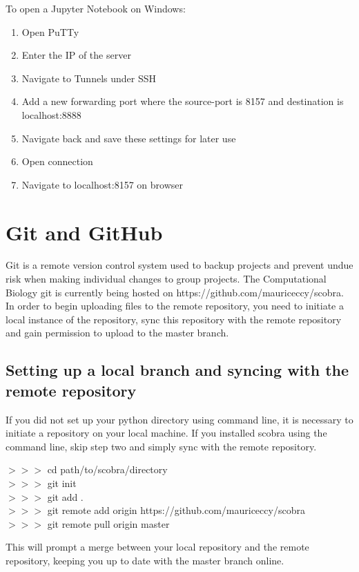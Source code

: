 To open a Jupyter Notebook on Windows:
\begin{enumerate}
\item Open PuTTy
\item Enter the IP of the server
\item Navigate to Tunnels under SSH
\item Add a new forwarding port where the source-port is 8157 and destination is localhost:8888
\item Navigate back and save these settings for later use
\item Open connection
\item Navigate to localhost:8157 on browser
\end{enumerate}

\section{Git and GitHub}
Git is a remote version control system used to backup projects and prevent undue risk when making individual changes to group projects. The Computational Biology git is currently being hosted on https://github.com/mauriceccy/scobra. In order to begin uploading files to the remote repository, you need to initiate a local instance of the repository, sync this repository with the remote repository and gain permission to upload to the master branch.

\subsection{Setting up a local branch and syncing with the remote repository}

If you did not set up your python directory using command line, it is necessary to initiate a repository on your local machine. If you installed scobra using the command line, skip step two and simply sync with the remote repository.

\begin{mdframed}
$>>>$ \quad cd path/to/scobra/directory\\
$>>>$ \quad git init\\
$>>>$ \quad git add .\\
$>>>$ \quad git remote add origin https://github.com/mauriceccy/scobra\\
$>>>$ \quad git remote pull origin master
\end{mdframed}

This will prompt a merge between your local repository and the remote repository, keeping you up to date with the master branch online.

